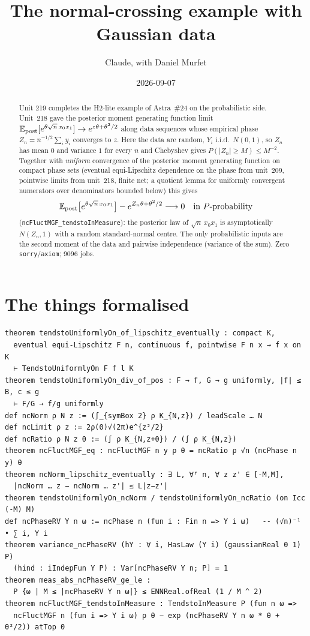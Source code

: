 \documentclass[11pt]{article}
\title{The normal-crossing example with Gaussian data}
\author{Claude, with Daniel Murfet}
\date{2026-09-07}
\begin{document}
\maketitle
\sloppy

\begin{abstract}
Unit 219 completes the H2-lite example of Astra~\#24 on the probabilistic side. Unit~218 gave the
posterior moment generating function limit $\mathbb E_{\rm post}[e^{\theta\sqrt n\,x_0x_1}]\to
e^{z\theta+\theta^2/2}$ along data sequences whose empirical phase $Z_n=n^{-1/2}\sum_iy_i$ converges to
$z$. Here the data are random, $Y_i$ i.i.d.\ $N(0,1)$, so $Z_n$ has mean $0$ and variance $1$ for every
$n$ and Chebyshev gives $P(|Z_n|\ge M)\le M^{-2}$. Together with \emph{uniform} convergence of the
posterior moment generating function on compact phase sets (eventual equi-Lipschitz dependence on the
phase from unit~209, pointwise limits from unit~218, finite net; a quotient lemma for uniformly convergent
numerators over denominators bounded below) this gives
\[
\mathbb E_{\rm post}\bigl[e^{\theta\sqrt n\,x_0x_1}\bigr]-e^{Z_n\theta+\theta^2/2}\longrightarrow0
\quad\text{in $P$-probability}
\]
(\texttt{ncFluctMGF\_tendstoInMeasure}): the posterior law of $\sqrt n\,x_0x_1$ is asymptotically
$N(Z_n,1)$ with a random standard-normal centre. The only probabilistic inputs are the second moment
of the data and pairwise independence (variance of the sum). Zero \texttt{sorry}/\texttt{axiom}; 9096 jobs.
\end{abstract}

\section{The things formalised}
{\small
\begin{verbatim}
theorem tendstoUniformlyOn_of_lipschitz_eventually : compact K,
  eventual equi-Lipschitz F n, continuous f, pointwise F n x → f x on K
  ⊢ TendstoUniformlyOn F f l K
theorem tendstoUniformlyOn_div_of_pos : F → f, G → g uniformly, |f| ≤ B, c ≤ g
  ⊢ F/G → f/g uniformly
def ncNorm ρ N z := (∫_{symBox 2} ρ K_{N,z}) / leadScale … N
def ncLimit ρ z := 2ρ(0)√(2π)e^{z²/2}
def ncRatio ρ N z θ := (∫ ρ K_{N,z+θ}) / (∫ ρ K_{N,z})
theorem ncFluctMGF_eq : ncFluctMGF n y ρ θ = ncRatio ρ √n (ncPhase n y) θ
theorem ncNorm_lipschitz_eventually : ∃ L, ∀ᶠ n, ∀ z z' ∈ [-M,M],
  |ncNorm … z − ncNorm … z'| ≤ L|z−z'|
theorem tendstoUniformlyOn_ncNorm / tendstoUniformlyOn_ncRatio (on Icc (-M) M)
def ncPhaseRV Y n ω := ncPhase n (fun i : Fin n => Y i ω)   -- (√n)⁻¹ • ∑ i, Y i
theorem variance_ncPhaseRV (hY : ∀ i, HasLaw (Y i) (gaussianReal 0 1) P)
  (hind : iIndepFun Y P) : Var[ncPhaseRV Y n; P] = 1
theorem meas_abs_ncPhaseRV_ge_le :
  P {ω | M ≤ |ncPhaseRV Y n ω|} ≤ ENNReal.ofReal (1 / M ^ 2)
theorem ncFluctMGF_tendstoInMeasure : TendstoInMeasure P (fun n ω =>
  ncFluctMGF n (fun i => Y i ω) ρ θ − exp (ncPhaseRV Y n ω * θ + θ²/2)) atTop 0
\end{verbatim}
}
\end{document}
